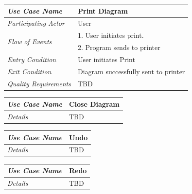 \documentclass[twoside,letterpaper]{article}
\begin{document}
\begin{flushleft}
\tablehead{}
\begin{tabular}{|m{2.0in} m{5.0in}|}
\hline
{\bfseries\emph{Use Case Name}}
& {\bfseries Print Diagram}
\\\hline
\emph{Participating Actor}
& User
\\\hline
\multirow{2}{*}{\emph{Flow of Events}}
& 1.  User initiates print. \\
& 2.  Program sends to printer
\\\hline
\emph{Entry Condition}
& User initiates Print
\\\hline
\emph{Exit Condition}
& Diagram successfully sent to printer
\\\hline
\emph{Quality Requirements}
& TBD
\\\hline
\end{tabular}
\end{flushleft}
\bigskip

\begin{flushleft}
\tablehead{}
\begin{tabular}{|m{2.0in} m{5.0in}|}
\hline
{\bfseries\emph{Use Case Name}}
& {\bfseries Close Diagram}
\\\hline
\emph{Details}
& TBD
\\\hline
\end{tabular}
\end{flushleft}
\bigskip

\begin{flushleft}
\tablehead{}
\begin{tabular}{|m{2.0in} m{5.0in}|}
\hline
{\bfseries\emph{Use Case Name}}
& {\bfseries Undo}
\\\hline
\emph{Details}
& TBD
\\\hline
\end{tabular}
\end{flushleft}
\bigskip

\begin{flushleft}
\tablehead{}
\begin{tabular}{|m{2.0in} m{5.0in}|}
\hline
{\bfseries\emph{Use Case Name}}
& {\bfseries Redo}
\\\hline
\emph{Details}
& TBD
\\\hline
\end{tabular}
\end{flushleft}
\bigskip


\clearpage
\end{document}
